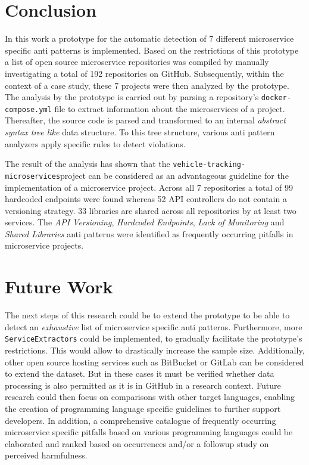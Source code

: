 \documentclass{article}
\begin{document}
\section{Conclusion}
In this work a prototype for the automatic detection of 7 different microservice specific anti patterns is implemented.
Based on the restrictions of this prototype a list of open source microservice repositories was compiled by manually investigating a total of 192 repositories on GitHub.
Subsequently, within the context of a case study, these 7 projects were then analyzed by the prototype.
The analysis by the prototype is carried out by parsing a repository's \lstinline{docker-compose.yml} file to extract information about the microservices of a project.
Thereafter, the source code is parsed and transformed to an internal \textit{abstract syntax tree like} data structure.
To this tree structure, various anti pattern analyzers apply specific rules to detect violations. \newline

The result of the analysis has shown that the \lstinline{vehicle-tracking-microservices}project can be considered as an advantageous guideline for the implementation of a microservice project.
Across all 7 repositories a total of 99 hardcoded endpoints were found whereas 52 API controllers do not contain a versioning strategy.
33 libraries are shared across all repositories by at least two services.
The \textit{API Versioning}, \textit{Hardcoded Endpoints}, \textit{Lack of Monitoring} and \textit{Shared Libraries} anti patterns were identified as frequently occurring pitfalls in microservice projects.

\section{Future Work}
The next steps of this research could be to extend the prototype to be able to detect an \textit{exhaustive} list of microservice specific anti patterns.
Furthermore, more \lstinline{ServiceExtractors} could be implemented, to gradually facilitate the prototype's restrictions.
This would allow to drastically increase the sample size.
Additionally, other open source hosting services such as BitBucket or GitLab can be considered to extend the dataset.
But in these cases it must be verified whether data processing is also permitted as it is in GitHub in a research context.
Future research could then focus on comparisons with other target languages, enabling the creation of programming language specific guidelines to further support developers.
In addition, a comprehensive catalogue of frequently occurring microservice specific pitfalls based on various programming languages could be elaborated and ranked based on occurrences and/or a followup study on perceived harmfulness.
\end{document}
